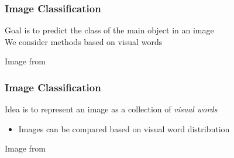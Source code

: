 \documentclass[xetex,professionalfont]{beamer}
\begin{document}
\begin{frame}
\frametitle{Image Classification}

Goal is to predict the class of the main object in an image\\\medskip
We consider methods based on visual words 

\medskip
\begin{center}
    {\centering Image from \cite{prince12}}
\end{center}

\end{frame}


\begin{frame}
\frametitle{Image Classification}

Idea is to represent an image as a collection of \emph{visual words} %
\begin{itemize}
    \item Images can be compared based on visual word distribution
\end{itemize}

\medskip
\begin{center}
    {\centering Image from \cite{prince12}}
\end{center}

\end{frame}
\end{document}
